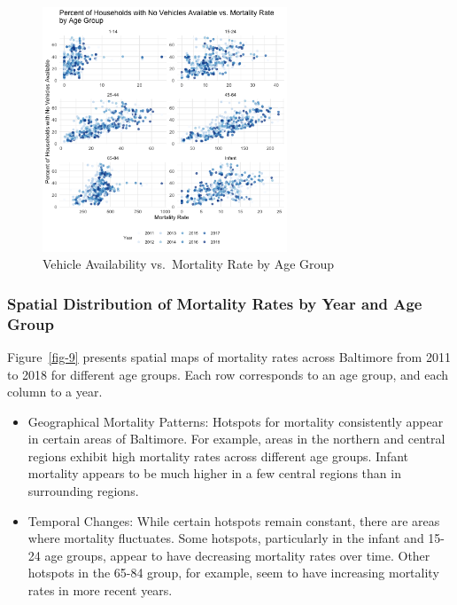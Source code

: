 \documentclass[
  letterpaper,
  DIV=11,
  numbers=noendperiod]{scrartcl}
\begin{document}
\begin{figure}

{\centering \includegraphics[width=0.65\textwidth,height=\textheight]{figures/novhcl_vs_mortality_by_age.png}

}

\caption{\label{fig-8}Vehicle Availability vs.~Mortality Rate by Age
Group}

\end{figure}

\hypertarget{spatial-distribution-of-mortality-rates-by-year-and-age-group}{%
\subsubsection{Spatial Distribution of Mortality Rates by Year and Age
Group}\label{spatial-distribution-of-mortality-rates-by-year-and-age-group}}

Figure~\ref{fig-9} presents spatial maps of mortality rates across
Baltimore from 2011 to 2018 for different age groups. Each row
corresponds to an age group, and each column to a year.

\begin{itemize}
\item
  Geographical Mortality Patterns: Hotspots for mortality consistently
  appear in certain areas of Baltimore. For example, areas in the
  northern and central regions exhibit high mortality rates across
  different age groups. Infant mortality appears to be much higher in a
  few central regions than in surrounding regions.
\item
  Temporal Changes: While certain hotspots remain constant, there are
  areas where mortality fluctuates. Some hotspots, particularly in the
  infant and 15-24 age groups, appear to have decreasing mortality rates
  over time. Other hotspots in the 65-84 group, for example, seem to
  have increasing mortality rates in more recent years.
\end{itemize}
\end{document}
